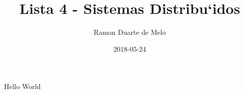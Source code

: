 \documentclass{uhassignment}
\title{Lista 4 - Sistemas Distribu`idos}
\date{2018-05-24}
\author{Ramon Duarte de Melo}
\begin{document}
        \maketitle
        \newpage
        
        Hello World
    
\end{document}
